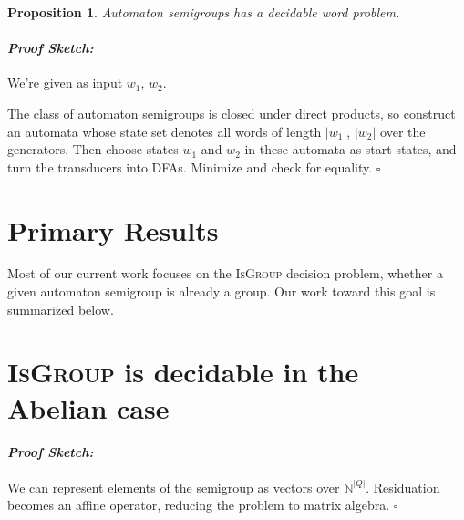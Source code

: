 \documentclass[a0,16pt]{a0poster}
\theoremstyle{pleasant}
\newtheorem{proposition}{Proposition}
\newtheorem{definition}{Definition}
\newenvironment{proofsketch}{\paragraph{\Large \normalfont \textit{Proof Sketch:}}}{\hfill$\square$}
\newcommand{\0}{\underline{0}}
\newcommand{\1}{\underline{1}}
\newcommand{\2}{\underline{2}}
\begin{document}
\begin{multicols}{3}


\begin{proposition}
Automaton semigroups has a decidable word problem.
\end{proposition}
\begin{proofsketch}
We're given as input $w_1$, $w_2$.

The class of automaton semigroups is closed under direct products, so construct an automata whose state set denotes all words of length $|w_1|$, $|w_2|$ over the generators. Then choose states $w_1$ and $w_2$ in these automata as start states, and turn the transducers into DFAs. Minimize and check for equality.
\end{proofsketch}

\section*{Primary Results}

Most of our current work focuses on the \textsc{IsGroup} decision problem, whether a given automaton semigroup is already a group. Our work toward this goal is summarized below.

\section*{\textsc{IsGroup} is decidable in the Abelian case}

\begin{proofsketch} 
We can represent elements of the semigroup as vectors over $\mathbb{N}^{|Q|}$. Residuation becomes an affine operator, reducing the problem to matrix algebra.
\end{proofsketch} 


\end{multicols}
\end{document}
